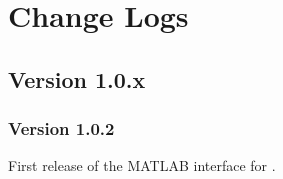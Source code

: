 
\chapter*{Change Logs} 

\section*{Version 1.0.x}
\subsection*{Version 1.0.2} 
First release of the MATLAB interface for {\ViennaCL}.
